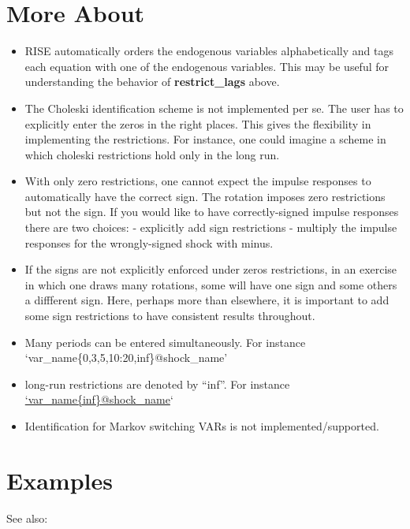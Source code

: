 \documentclass[letterpaper,10pt,english]{sphinxmanual}
\begin{document}
\section{More About}
\label{classes/models/@rfvar/rfvar:id142}\begin{itemize}
\item {} 
RISE automatically orders the endogenous variables alphabetically and
tags each equation with one of the endogenous variables. This may be
useful for understanding the behavior of \textbf{restrict\_lags} above.

\item {} 
The Choleski identification scheme is not implemented per se. The user
has to explicitly enter the zeros in the right places. This gives the
flexibility in implementing the restrictions. For instance, one could
imagine a scheme in which choleski restrictions hold only in the long
run.

\item {} 
With only zero restrictions, one cannot expect the impulse responses to
automatically have the correct sign. The rotation imposes zero
restrictions but not the sign. If you would like to have
correctly-signed impulse responses there are two choices:
- explicitly add sign restrictions
- multiply the impulse responses for the wrongly-signed shock with
minus.

\item {} 
If the signs are not explicitly enforced under zeros restrictions,
in an exercise in which one draws many rotations, some will have
one sign and some others a diffferent sign. Here, perhaps more than
elsewhere, it is important to add some sign restrictions to have
consistent results throughout.

\item {} 
Many periods can be entered simultaneously. For instance
`var\_name\{0,3,5,10:20,inf\}@shock\_name'

\item {} 
long-run restrictions are denoted by ``inf''. For instance
\href{mailto:'var\_name\{inf\}@shock\_name}{`var\_name\{inf\}@shock\_name}`

\item {} 
Identification for Markov switching VARs is not implemented/supported.

\end{itemize}


\section{Examples}
\label{classes/models/@rfvar/rfvar:id143}
See also:
\end{document}
